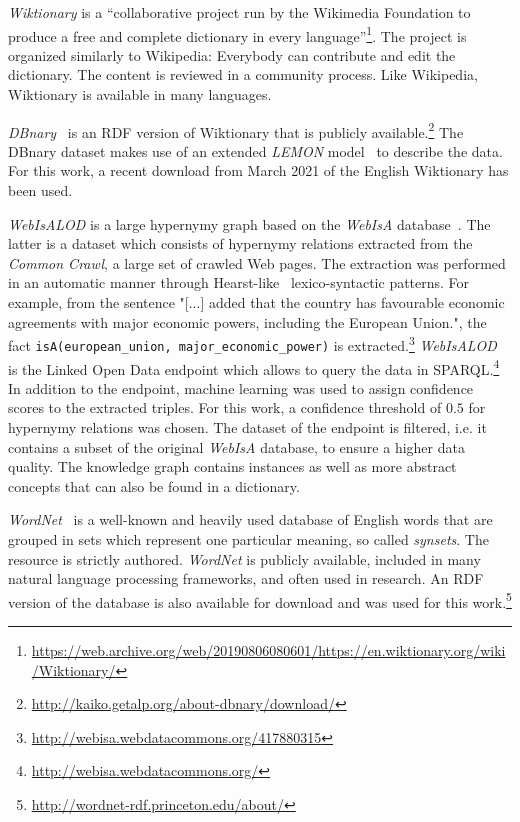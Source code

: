 \documentclass[runningheads]{llncs}
\begin{document}
\emph{Wiktionary} is a ``collaborative project run by the Wikimedia Foundation to produce a free and complete dictionary in every language''\footnote{\url{https://web.archive.org/web/20190806080601/https://en.wiktionary.org/wiki/Wiktionary/}}. The project is organized similarly to Wikipedia: Everybody can contribute and edit the dictionary. The content is reviewed in a community process. Like Wikipedia, Wiktionary is available in many languages.

\emph{DBnary}~\cite{dbnary_2015} is an RDF version of Wiktionary that is publicly available.\footnote{\url{http://kaiko.getalp.org/about-dbnary/download/}} The DBnary dataset makes use of an extended \textit{LEMON} model~\cite{mccrae_interchanging_2012} to describe the data. For this work, a recent download from March 2021 of the English Wiktionary has been used. 

\emph{WebIsALOD} is a large hypernymy graph based on the \textit{WebIsA} database~\cite{webisa_db}. The latter is a dataset which consists of hypernymy relations extracted from the \textit{Common Crawl}, a large set of crawled Web pages. The extraction was performed in an automatic manner through Hearst-like~\cite{hearst} lexico-syntactic patterns. For example, from the sentence "[...] added that the country has favourable economic agreements with major economic powers, including the European Union.", the fact \texttt{isA(european\_union, major\_economic\_power)} is extracted.\footnote{\url{http://webisa.webdatacommons.org/417880315}} \textit{WebIsALOD}~\cite{webisalod} is the Linked Open Data endpoint which allows to query the data in SPARQL.\footnote{\url{http://webisa.webdatacommons.org/}} In addition to the endpoint, machine learning was used to assign confidence scores to the extracted triples. For this work, a confidence threshold of $0.5$ for hypernymy relations was chosen. The dataset of the endpoint is filtered, i.e. it contains a subset of the original \textit{WebIsA} database, to ensure a higher data quality. The knowledge graph contains instances as well as more abstract concepts that can also be found in a dictionary. 

\emph{WordNet}~\cite{fellbaum_wordnet} is a well-known and heavily used database of English words that are grouped in sets which represent one particular meaning, so called \textit{synsets}. The resource is strictly authored. \textit{WordNet} is publicly available, included in many natural language processing frameworks, and often used in research. An RDF version of the database is also available for download and was used for this work.\footnote{\url{http://wordnet-rdf.princeton.edu/about/}}
\end{document}
